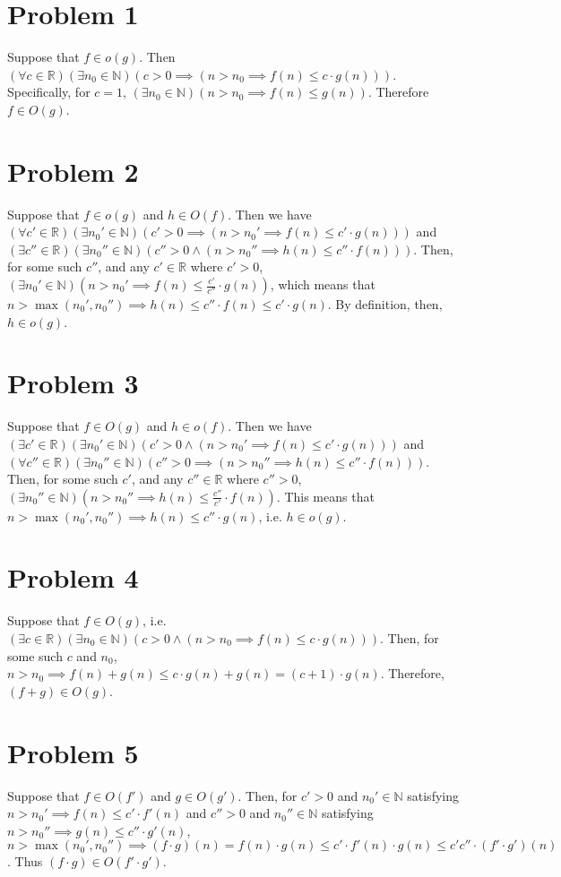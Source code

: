 \documentclass[12pt]{article}
\begin{document}
	\section{Problem 1}
		Suppose that $f \in o(g)$. Then $(\forall c \in \mathbb{R})(\exists n_0 \in \mathbb{N})(c > 0 \implies (n > n_0 \implies f(n) \le c \cdot g(n)))$. Specifically, for $c = 1$, $(\exists n_0 \in \mathbb{N})(n > n_0 \implies f(n) \le g(n))$. Therefore $f \in O(g)$.
	\section{Problem 2}
		Suppose that $f \in o(g)$ and $h \in O(f)$. Then we have $(\forall c' \in \mathbb{R})(\exists n_0' \in \mathbb{N})(c' > 0 \implies (n > n_0' \implies f(n) \le c' \cdot g(n)))$ and $(\exists c'' \in \mathbb{R})(\exists n_0'' \in \mathbb{N})(c'' > 0 \wedge (n > n_0'' \implies h(n) \le c'' \cdot f(n)))$. Then, for some such $c''$, and any $c' \in \mathbb{R}$ where $c' > 0$, $(\exists n_0' \in \mathbb{N})(n > n_0' \implies f(n) \le \frac{c'}{c''} \cdot g(n))$, which means that $n > \max(n_0', n_0'') \implies h(n) \le c'' \cdot f(n) \le c' \cdot g(n)$. By definition, then, $h \in o(g)$.
	\section{Problem 3}
		Suppose that $f \in O(g)$ and $h \in o(f)$. Then we have $(\exists c' \in \mathbb{R})(\exists n_0' \in \mathbb{N})(c' > 0 \wedge (n > n_0' \implies f(n) \le c' \cdot g(n)))$ and $(\forall c'' \in \mathbb{R})(\exists n_0'' \in \mathbb{N})(c'' > 0 \implies (n > n_0'' \implies h(n) \le c'' \cdot f(n)))$. Then, for some such $c'$, and any $c'' \in \mathbb{R}$ where $c'' > 0$, $(\exists n_0'' \in \mathbb{N})(n > n_0'' \implies h(n) \le \frac{c''}{c'} \cdot f(n))$. This means that $n > \max(n_0', n_0'') \implies h(n) \le c'' \cdot g(n)$, i.e. $h \in o(g)$.
	\section{Problem 4}
		Suppose that $f \in O(g)$, i.e. $(\exists c \in \mathbb{R})(\exists n_0 \in \mathbb{N})(c > 0 \wedge (n > n_0 \implies f(n) \le c \cdot g(n)))$. Then, for some such $c$ and $n_0$, $n > n_0 \implies f(n) + g(n) \le c \cdot g(n) + g(n) = (c + 1) \cdot g(n)$. Therefore, $(f + g) \in O(g)$.
	\section{Problem 5}
		Suppose that $f \in O(f')$ and $g \in O(g')$. Then, for $c' > 0$ and $n_0' \in \mathbb{N}$ satisfying $n > n_0' \implies f(n) \le c' \cdot f'(n)$ and $c'' > 0$ and $n_0'' \in \mathbb{N}$ satisfying $n > n_0'' \implies g(n) \le c'' \cdot g'(n)$, $n > \max(n_0', n_0'') \implies (f \cdot g)(n) = f(n) \cdot g(n) \le c' \cdot f'(n) \cdot g(n) \le c'c'' \cdot (f' \cdot g')(n)$. Thus $(f \cdot g) \in O(f' \cdot g')$.
\end{document}
